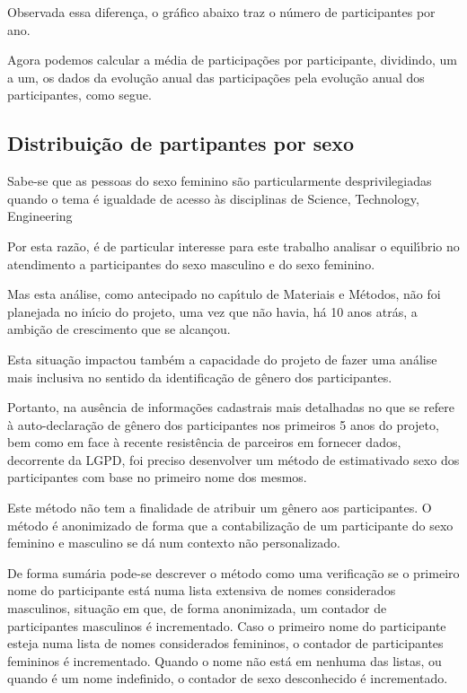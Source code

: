 \documentclass[
12pt,		%
openright,	%
twoside,  %
a4paper,			%
chapter=TITLE,		%
english,			%
french,				%
spanish,			%
brazil				%
]{USPSC-classe/USPSC}
\begin{document}
Observada essa diferen\c{c}a, o gr\'afico abaixo traz o n\'umero de participantes por ano.


Agora podemos calcular a m\'edia de participa\c{c}\~oes por participante, dividindo, um a um, os dados da evolu\c{c}\~ao anual das participa\c{c}\~oes pela evolu\c{c}\~ao anual dos participantes, como segue.


\subsection[Distribui\c{c}\~ao de partipantes por sexo]{Distribui\c{c}\~ao de partipantes por sexo}\label{Distribui\c{c}\~ao de partipantes por sexo}
Sabe-se que as pessoas do sexo feminino s\~ao particularmente desprivilegiadas quando o tema \'e igualdade de acesso \`as disciplinas de Science, Technology, Engineering 


Por esta raz\~ao, \'e de particular interesse para este trabalho analisar o equil\'{\i}brio no atendimento a participantes do sexo masculino e do sexo feminino.


Mas esta an\'alise, como antecipado no cap\'{\i}tulo de Materiais e M\'etodos, n\~ao foi planejada no in\'{\i}cio do projeto, uma vez que n\~ao havia, h\'a 10 anos atr\'as, a ambi\c{c}\~ao de crescimento que se alcan\c{c}ou.


Esta situa\c{c}\~ao impactou tamb\'em a capacidade do projeto de fazer uma an\'alise mais inclusiva no sentido da identifica\c{c}\~ao de g\^enero dos participantes.


Portanto, na aus\^encia de informa\c{c}\~oes cadastrais mais detalhadas no que se refere \`a auto-declara\c{c}\~ao de g\^enero dos participantes nos primeiros 5 anos do projeto, bem como em face \`a recente resist\^encia de parceiros em fornecer dados, decorrente da LGPD, foi preciso desenvolver um m\'etodo de \textquotedbl estimativa\textquotedbl  do sexo dos participantes com base no primeiro nome dos mesmos.


Este m\'etodo n\~ao tem a finalidade de atribuir um g\^enero aos participantes. O m\'etodo \'e anonimizado de forma que a contabiliza\c{c}\~ao de um participante do sexo feminino e masculino se d\'a num contexto n\~ao personalizado.


De forma sum\'aria pode-se descrever o m\'etodo como uma verifica\c{c}\~ao se o primeiro nome do participante est\'a numa lista extensiva de nomes \textquotedbl considerados masculinos\textquotedbl , situa\c{c}\~ao em que, de forma anonimizada, um contador de participantes masculinos \'e incrementado. Caso o primeiro nome do participante esteja numa lista de nomes \textquotedbl considerados femininos\textquotedbl , o contador de participantes femininos \'e incrementado. Quando o nome n\~ao est\'a em nenhuma das listas, ou quando \'e um nome indefinido, o contador de \textquotedbl sexo desconhecido \'e incrementado\textquotedbl .
\end{document}
